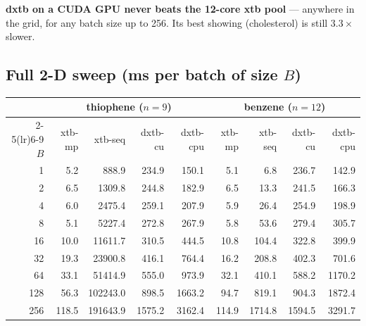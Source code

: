 \documentclass[11pt]{article}
\begin{document}
\noindent
\textbf{dxtb on a CUDA GPU never beats the 12-core xtb pool} --- anywhere in the
grid, for any batch size up to 256. Its best showing (cholesterol) is still
$3.3\times$ slower.

\subsection{Full 2-D sweep (ms per batch of size $B$)}

\begin{center}\small
\setlength{\tabcolsep}{4pt}
\begin{tabular}{r  rrrr  rrrr}
\toprule
 & \multicolumn{4}{c}{\textbf{thiophene} ($n=9$)} & \multicolumn{4}{c}{\textbf{benzene} ($n=12$)} \\
\cmidrule(lr){2-5}\cmidrule(lr){6-9}
$B$ & xtb-mp & xtb-seq & dxtb-cu & dxtb-cpu & xtb-mp & xtb-seq & dxtb-cu & dxtb-cpu \\
\midrule
1   & 5.2   & 888.9    & 234.9  & 150.1  & 5.1   & 6.8     & 236.7  & 142.9 \\
2   & 6.5   & 1309.8   & 244.8  & 182.9  & 6.5   & 13.3    & 241.5  & 166.3 \\
4   & 6.0   & 2475.4   & 259.1  & 207.9  & 5.9   & 26.4    & 254.9  & 198.9 \\
8   & 5.1   & 5227.4   & 272.8  & 267.9  & 5.8   & 53.6    & 279.4  & 305.7 \\
16  & 10.0  & 11611.7  & 310.5  & 444.5  & 10.8  & 104.4   & 322.8  & 399.9 \\
32  & 19.3  & 23900.8  & 416.1  & 764.4  & 16.2  & 208.8   & 402.3  & 701.6 \\
64  & 33.1  & 51414.9  & 555.0  & 973.9  & 32.1  & 410.1   & 588.2  & 1170.2 \\
128 & 56.3  & 102243.0 & 898.5  & 1663.2 & 94.7  & 819.1   & 904.3  & 1872.4 \\
256 & 118.5 & 191643.9 & 1575.2 & 3162.4 & 114.9 & 1714.8  & 1594.5 & 3291.7 \\
\bottomrule
\end{tabular}


\end{center}
\end{document}
